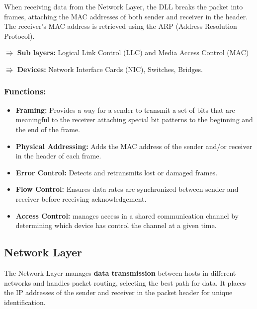 When receiving data from the Network Layer, the DLL breaks the packet into frames, attaching the MAC addresses of both sender and receiver in the header. The receiver's MAC address is retrieved using the ARP (Address
Resolution Protocol).

$\Rrightarrow$ \textbf{Sub layers:} Logical Link Control (LLC) and Media Access Control (MAC)

$\Rrightarrow$ \textbf{Devices:} Network Interface Cards (NIC), Switches, Bridges.



\subsubsection{Functions:}
\begin{itemize}
   \item \textbf{Framing:}
   Provides a way for a sender to transmit a set of bits that are meaningful to the receiver attaching special bit patterns to the beginning and the end of the frame.
   \item \textbf{Physical Addressing:}
   Adds the MAC address of the sender and/or receiver in the header of each frame.
   \item \textbf{Error Control:}
   Detects and retransmits lost or damaged frames.
   \item \textbf{Flow Control:}
   Ensures data rates are synchronized between sender and receiver before receiving acknowledgement.
   \item \textbf{Access Control:}
   manages access in a shared communication channel by determining which device has control the channel at a given time.
\end{itemize}



\vspace{1em}
\subsection{Network Layer}
The Network Layer manages \textbf{data transmission} between hosts in different networks and handles packet routing, selecting the best path for data. It places the IP addresses of the sender and receiver in the packet header for unique identification.

